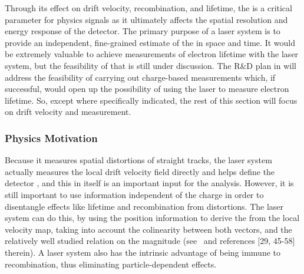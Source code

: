 

Through its effect on drift velocity, recombination, and lifetime, the \efield is a critical parameter for physics signals as it ultimately affects the spatial resolution and energy response of the detector. The primary purpose of a laser system is to provide an independent, fine-grained estimate of the \efield in space and time. It would be extremely valuable to achieve measurements of electron lifetime with the laser system, but the feasibility of that is still under discussion.
The R\&D plan in  will address the feasibility of carrying out charge-based measurements which, if successful, would open up the possibility of using the laser to measure electron lifetime. So, except where specifically indicated, the rest of this section will focus on drift velocity and \efield measurement.

\subsubsection{Physics Motivation}
Because it measures spatial distortions of straight tracks, the laser system actually measures the local drift velocity field directly and helps define the detector , and this in itself is an important input for the  analysis. 
However, it is still important to use information independent of the charge in order to disentangle effects like lifetime and recombination from \efield distortions. The laser system can do this, by using the position information to derive the \efield from the local velocity map, taking into account the colinearity between both vectors, and the relatively well studied relation on the magnitude (see~\cite{Li:2015rqa} and references [29, 45-58] therein). A laser system also has the intrinsic advantage of being immune to recombination, thus eliminating particle-dependent effects.  


